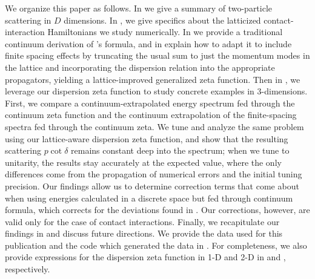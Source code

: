 We organize this paper as follows.
In  we give a summary of two-particle scattering in $D$ dimensions.
In , we give specifics about the latticized contact-interaction Hamiltonians we study numerically.
In  we provide a traditional continuum derivation of \Luscher's formula, and in  explain how to adapt it to include finite spacing effects by truncating the usual sum to just the momentum modes in the lattice and incorporating the dispersion relation into the appropriate propagators, yielding a lattice-improved generalized \Luscher zeta function.
Then in , we leverage our dispersion zeta function to study concrete examples in 3-dimensions.
First, we compare a continuum-extrapolated energy spectrum fed through the continuum zeta function and the continuum extrapolation of the finite-spacing spectra fed through the continuum zeta.
We tune and analyze the same problem using our lattice-aware dispersion zeta function, and show that the resulting scattering $p\cot\delta$ remains constant deep into the spectrum; when we tune to unitarity, the results stay accurately at the expected value, where the only differences come from the propagation of numerical errors and the initial tuning precision.
Our findings allow us to determine correction terms that come about when using energies calculated in a discrete space but fed through continuum \Luscher formula, which corrects for the deviations found in .
Our corrections, however, are valid only for the case of contact interactions.
Finally, we recapitulate our findings in  and discuss future directions.
We provide the data used for this publication and the code which generated the data in .
For completeness, we also provide expressions for the dispersion zeta function in 1-D and 2-D in  and , respectively.
